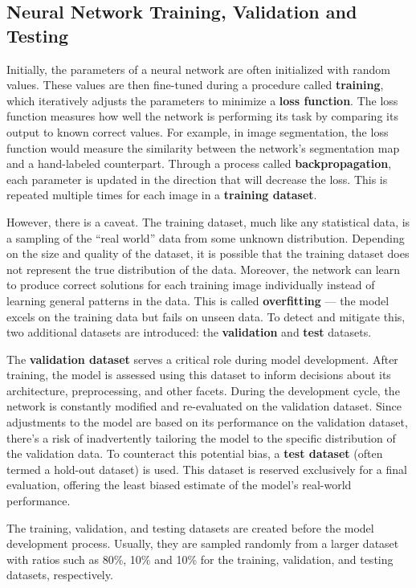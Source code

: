 \subsection{Neural Network Training, Validation and Testing}

Initially, the parameters of a neural network are often initialized with random values. These values are then fine-tuned during a procedure called \textbf{training}, which iteratively adjusts the parameters to minimize a \textbf{loss function}. The loss function measures how well the network is performing its task by comparing its output to known correct values. For example, in image segmentation, the loss function would measure the similarity between the network's segmentation map and a hand-labeled counterpart. Through a process called \textbf{backpropagation}, each parameter is updated in the direction that will decrease the loss. This is repeated multiple times for each image in a \textbf{training dataset}.

However, there is a caveat. The training dataset, much like any statistical data, is a sampling of the ``real world'' data from some unknown distribution. Depending on the size and quality of the dataset, it is possible that the training dataset does not represent the true distribution of the data. Moreover, the network can learn to produce correct solutions for each training image individually instead of learning general patterns in the data. This is called \textbf{overfitting} --- the model excels on the training data but fails on unseen data. To detect and mitigate this, two additional datasets are introduced: the \textbf{validation} and \textbf{test} datasets.

The \textbf{validation dataset} serves a critical role during model development. After training, the model is assessed using this dataset to inform decisions about its architecture, preprocessing, and other facets. During the development cycle, the network is constantly modified and re-evaluated on the validation dataset. Since adjustments to the model are based on its performance on the validation dataset, there's a risk of inadvertently tailoring the model to the specific distribution of the validation data. To counteract this potential bias, a \textbf{test dataset} (often termed a hold-out dataset) is used. This dataset is reserved exclusively for a final evaluation, offering the least biased estimate of the model's real-world performance.

The training, validation, and testing datasets are created before the model development process. Usually, they are sampled randomly from a larger dataset with ratios such as 80\%, 10\% and 10\% for the training, validation, and testing datasets, respectively. 

